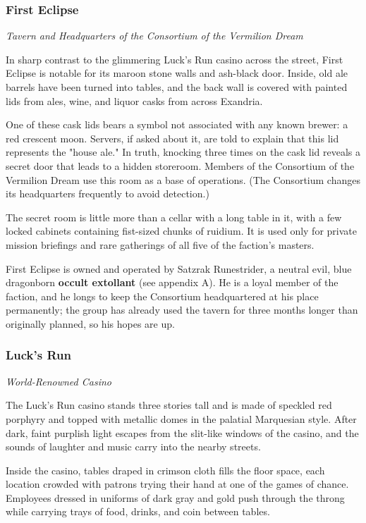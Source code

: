 \documentclass[10pt,a4paper,twoside,bg=print,twocolumn,openany,nodeprecatedcode]{dndbook}
\begin{document}
\subsubsection{First Eclipse}
\textit{Tavern and Headquarters of the Consortium of the Vermilion Dream}

In sharp contrast to the glimmering Luck's Run casino across the street, First Eclipse is notable for its maroon stone walls and ash-black door. Inside, old ale barrels have been turned into tables, and the back wall is covered with painted lids from ales, wine, and liquor casks from across Exandria.

One of these cask lids bears a symbol not associated with any known brewer: a red crescent moon. Servers, if asked about it, are told to explain that this lid represents the "house ale." In truth, knocking three times on the cask lid reveals a secret door that leads to a hidden storeroom. Members of the Consortium of the Vermilion Dream use this room as a base of operations. (The Consortium changes its headquarters frequently to avoid detection.)

The secret room is little more than a cellar with a long table in it, with a few locked cabinets containing fist-sized chunks of ruidium. It is used only for private mission briefings and rare gatherings of all five of the faction's masters.

First Eclipse is owned and operated by Satzrak Runestrider, a neutral evil, blue dragonborn \textbf{occult extollant} (see appendix A). He is a loyal member of the faction, and he longs to keep the Consortium headquartered at his place permanently; the group has already used the tavern for three months longer than originally planned, so his hopes are up.

\subsubsection{Luck's Run}
\textit{World-Renowned Casino}

The Luck's Run casino stands three stories tall and is made of speckled red porphyry and topped with metallic domes in the palatial Marquesian style. After dark, faint purplish light escapes from the slit-like windows of the casino, and the sounds of laughter and music carry into the nearby streets.

Inside the casino, tables draped in crimson cloth fills the floor space, each location crowded with patrons trying their hand at one of the games of chance. Employees dressed in uniforms of dark gray and gold push through the throng while carrying trays of food, drinks, and coin between tables.
\end{document}
